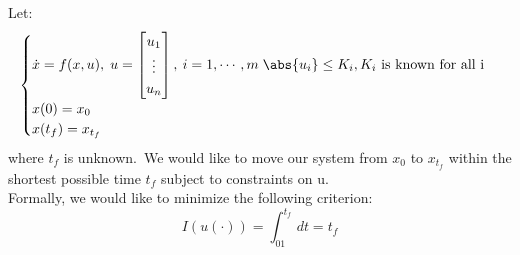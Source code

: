 {
    Let:
    \begin{equation}
        \begin{cases}
        \dot{x} = f(x,u),\; u = \begin{bmatrix}
            u_1  \\
            \vdots\\
            u_n
        \end{bmatrix},\:i=1,\cdots ,m\; \abs{u_i} \le K_i, \text{$K_i$ is known for all i}\\
        x(0) = x_0\\
        x(t_f) = x_{t_f}
            
        \end{cases}
    \end{equation}
    where $t_f$ is unknown.\
    We would like to move our system from  $x_0$ to $x_{t_f}$ within the shortest possible time $t_f$ subject to constraints on u.\\
    Formally, we would like to minimize the following criterion:
    \begin{equation}
        I(u(\cdot)) = \int^{t_f}_01dt = t_f
    \end{equation}
}


